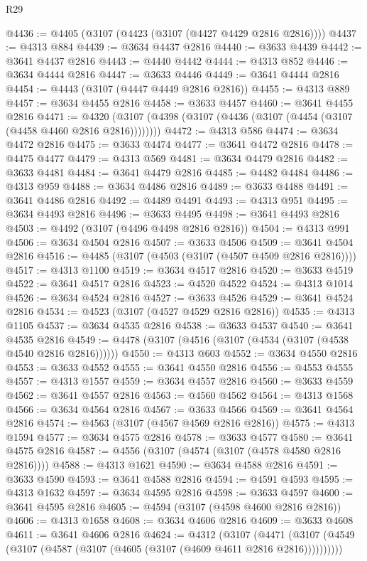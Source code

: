 \begin{lexlean}{R29}
\begin{coremodule}
@4436 := @4405 (@3107 (@4423 (@3107 (@4427 @4429 @2816 @2816))))
@4437 := @4313 @884
@4439 := @3634 @4437 @2816
@4440 := @3633 @4439
@4442 := @3641 @4437 @2816
@4443 := @4440 @4442
@4444 := @4313 @852
@4446 := @3634 @4444 @2816
@4447 := @3633 @4446
@4449 := @3641 @4444 @2816
@4454 := @4443 (@3107 (@4447 @4449 @2816 @2816))
@4455 := @4313 @889
@4457 := @3634 @4455 @2816
@4458 := @3633 @4457
@4460 := @3641 @4455 @2816
@4471 := @4320 (@3107 (@4398 (@3107 (@4436 (@3107 (@4454 (@3107 (@4458 @4460 @2816 @2816))))))))
@4472 := @4313 @586
@4474 := @3634 @4472 @2816
@4475 := @3633 @4474
@4477 := @3641 @4472 @2816
@4478 := @4475 @4477
@4479 := @4313 @569
@4481 := @3634 @4479 @2816
@4482 := @3633 @4481
@4484 := @3641 @4479 @2816
@4485 := @4482 @4484
@4486 := @4313 @959
@4488 := @3634 @4486 @2816
@4489 := @3633 @4488
@4491 := @3641 @4486 @2816
@4492 := @4489 @4491
@4493 := @4313 @951
@4495 := @3634 @4493 @2816
@4496 := @3633 @4495
@4498 := @3641 @4493 @2816
@4503 := @4492 (@3107 (@4496 @4498 @2816 @2816))
@4504 := @4313 @991
@4506 := @3634 @4504 @2816
@4507 := @3633 @4506
@4509 := @3641 @4504 @2816
@4516 := @4485 (@3107 (@4503 (@3107 (@4507 @4509 @2816 @2816))))
@4517 := @4313 @1100
@4519 := @3634 @4517 @2816
@4520 := @3633 @4519
@4522 := @3641 @4517 @2816
@4523 := @4520 @4522
@4524 := @4313 @1014
@4526 := @3634 @4524 @2816
@4527 := @3633 @4526
@4529 := @3641 @4524 @2816
@4534 := @4523 (@3107 (@4527 @4529 @2816 @2816))
@4535 := @4313 @1105
@4537 := @3634 @4535 @2816
@4538 := @3633 @4537
@4540 := @3641 @4535 @2816
@4549 := @4478 (@3107 (@4516 (@3107 (@4534 (@3107 (@4538 @4540 @2816 @2816))))))
@4550 := @4313 @603
@4552 := @3634 @4550 @2816
@4553 := @3633 @4552
@4555 := @3641 @4550 @2816
@4556 := @4553 @4555
@4557 := @4313 @1557
@4559 := @3634 @4557 @2816
@4560 := @3633 @4559
@4562 := @3641 @4557 @2816
@4563 := @4560 @4562
@4564 := @4313 @1568
@4566 := @3634 @4564 @2816
@4567 := @3633 @4566
@4569 := @3641 @4564 @2816
@4574 := @4563 (@3107 (@4567 @4569 @2816 @2816))
@4575 := @4313 @1594
@4577 := @3634 @4575 @2816
@4578 := @3633 @4577
@4580 := @3641 @4575 @2816
@4587 := @4556 (@3107 (@4574 (@3107 (@4578 @4580 @2816 @2816))))
@4588 := @4313 @1621
@4590 := @3634 @4588 @2816
@4591 := @3633 @4590
@4593 := @3641 @4588 @2816
@4594 := @4591 @4593
@4595 := @4313 @1632
@4597 := @3634 @4595 @2816
@4598 := @3633 @4597
@4600 := @3641 @4595 @2816
@4605 := @4594 (@3107 (@4598 @4600 @2816 @2816))
@4606 := @4313 @1658
@4608 := @3634 @4606 @2816
@4609 := @3633 @4608
@4611 := @3641 @4606 @2816
@4624 := @4312
    (@3107
      (@4471 (@3107 (@4549 (@3107 (@4587 (@3107 (@4605 (@3107 (@4609 @4611 @2816 @2816))))))))))

\end{coremodule}
\end{lexlean}
